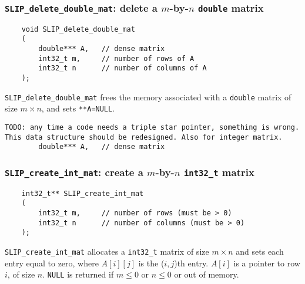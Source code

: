 \documentclass[12pt]{article}
\theoremstyle{definition}
\begin{document}
\cprotect\subsubsection{\verb|SLIP_delete_double_mat|: delete a $m$-by-$n$ \verb|double| matrix}

\begin{mdframed}[userdefinedwidth=6in]
{\footnotesize
\begin{verbatim}
    void SLIP_delete_double_mat
    (
        double*** A,   // dense matrix
        int32_t m,     // number of rows of A
        int32_t n      // number of columns of A
    );
\end{verbatim}
} \end{mdframed}

\verb|SLIP_delete_double_mat| frees the memory associated with a \verb|double|
matrix of size $m \times n$, and sets \verb|**A=NULL|.


\begin{verbatim}
TODO: any time a code needs a triple star pointer, something is wrong.
This data structure should be redesigned. Also for integer matrix.
        double*** A,   // dense matrix
\end{verbatim}

\cprotect\subsubsection{\verb|SLIP_create_int_mat|: create a $m$-by-$n$ \verb|int32_t| matrix}

\begin{mdframed}[userdefinedwidth=6in]
{\footnotesize
\begin{verbatim}
    int32_t** SLIP_create_int_mat
    (
        int32_t m,     // number of rows (must be > 0)
        int32_t n      // number of columns (must be > 0)
    );
\end{verbatim}
} \end{mdframed}

\verb|SLIP_create_int_mat| allocates a \verb|int32_t| matrix of size $m \times
n$ and sets each entry equal to zero, where $A[i][j]$ is the ($i,j$)th entry.
$A[i]$ is a pointer to row $i$, of size $n$. \verb|NULL| is returned if
$m \le 0 $ or $n\le 0$ or out of memory.
\end{document}
